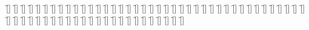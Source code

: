 \begin{questions}
\begin{multicols}{2}
        \question  \f[]
        \question  \f[]
        \question  \f[]
        \question  \f[]
        \question  \f[]
        \question  \f[]
        \question  \f[]
        \question  \f[]
        \question  \f[]
        \question  \f[]
        \question  \f[]
        \question  \f[]
        \question  \f[]
        \question  \f[]
        \question  \f[]
        \question  \f[]
        \question  \f[]
        \question  \f[]
        \question  \f[]
        \question  \f[]
        \question  \f[]
        \question  \f[]
        \question  \f[]
        \question  \f[]
        \question  \f[]
        \question  \f[]
        \question  \f[]
        \question  \f[]
        \question  \f[]
        \question  \f[]
        \question  \f[]
        \question  \f[]
        \question  \f[]
        \question  \f[]
        \question  \f[]
        \question  \f[]
        \question  \f[]
        \question  \f[]
        \question  \f[]
        \question  \f[]
        \question  \f[]
        \question  \f[]
        \question  \f[]
        \question  \f[]
        \question  \f[]
        \question  \f[]
        \question  \f[]
        \question  \f[]
        \question  \f[]
        \question  \f[]
        \question  \f[]
        \question  \f[]
        \question  \f[]
        \question  \f[]
        \question  \f[]
        \question  \f[]
        \question  \f[]
        \question  \f[]
        \question  \f[]
        \question  \f[]
        \question  \f[]
        \question  \f[]
        \question  \f[]
        \question  \f[]
    \end{multicols}
\end{questions}
